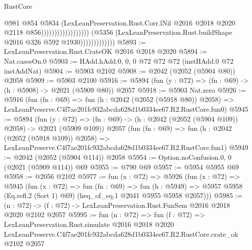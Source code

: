 \begin{lexlean}{RustCore}
\begin{coremodule}
                                                            @981
                                                            @854
                                                            @5834
                                                            (LexLeanPreservation.Rust.Corr.lNil
                                                              @2016
                                                              @2018
                                                              @2020
                                                              @2118
                                                              @856))))))))))))))))))
                          (@5356
                            (LexLeanPreservation.Rust.buildShape @2016 @326 @592 @1930)))))))))))))
@5893 := LexLeanPreservation.Rust.CrateOK @2016 @2018 @2020
@5894 := Nat.casesOn.{0}
@5903 := HAdd.hAdd.{0, 0, 0} @72 @72 @72 (instHAdd.{0} @72 instAddNat)
@5904 := @5903 @2102
@5908 := @2042 (@2052 (@5904 @80)) @2058
@5909 := @5903 @2100
@5916 := @5894 (fun (y : @72) => (fn : @69) -> (h : @5908) -> @2021 (@5909 @80)) @2057
@5918 := @5903 Nat.zero
@5926 := @5916
    (fun (fn : @69) =>
    fun (h : @2042 (@2052 (@5918 @80)) @2058) =>
    LexLeanPreserve.C4f7ae201fc932abcda628d1b0334ee67.R2.RustCore.fun0)
@5945 := @5894
    (fun (y : @72) => (fn : @69) -> (h : @2042 (@2052 (@5904 @109)) @2058) -> @2021 (@5909 @109))
    @2057
    (fun (fn : @69) =>
    fun (h : @2042 (@2052 (@5918 @109)) @2058) =>
    LexLeanPreserve.C4f7ae201fc932abcda628d1b0334ee67.R2.RustCore.fun1)
@5949 := @2042 (@2052 (@5904 @114)) @2058
@5954 := Option.noConfusion.{0, 0} (@2021 (@5909 @114)) @69
@5955 := @790 @69
@5957 := @5954 @5955 @69
@5958 := @2056 @2102
@5977 := fun (x : @72) =>
  @5926
    (fun (x : @72) =>
    @5945
      (fun (x : @72) =>
      fun (fn : @69) =>
      fun (h : @5949) =>
      @5957 @5958 (Eq.refl.{2} (Sort 1) @69) (heq_of_eq.{1} @2041 @5955 @5958 @2057)))
@5985 := (n : @72) -> (f : @72) -> LexLeanPreservation.Rust.FunSem @2016 @2018 @2020 @2102 @2057
@5995 := fun (n : @72) =>
  fun (f : @72) =>
  LexLeanPreservation.Rust.simulate
    @2016
    @2018
    @2020
    LexLeanPreserve.C4f7ae201fc932abcda628d1b0334ee67.R2.RustCore.crate_ok
    @2102
    @2057
\end{coremodule}
\end{lexlean}
